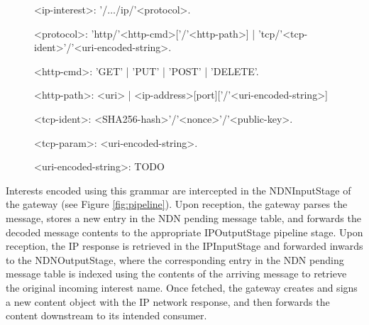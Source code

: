 \begin{figure}
\begin{mdframed}
\begingrammar
\noindent
<ip-interest>:	'/$\dots$/ip/'<protocol>.

<protocol>:	'http/'<http-cmd>[{'/'<http-path>}] | 'tcp/'<tcp-ident>'/'<uri-encoded-string>. 

<http-cmd>: 'GET' | 'PUT' | 'POST' | 'DELETE'.


<http-path>: <uri> | <ip-address>[port]['/'<uri-encoded-string>]

<tcp-ident>: <SHA256-hash>'/'<nonce>'/'<public-key>. %

<tcp-param>: <uri-encoded-string>.

<uri-encoded-string>: TODO



		
\endgrammar
\end{mdframed}
\end{figure}

Interests encoded using this grammar are intercepted in the NDNInputStage of the gateway (see Figure \ref{fig:pipeline}). Upon reception, the gateway parses the message, stores a new entry in the NDN pending message table, and forwards the decoded message contents to the appropriate IPOutputStage pipeline stage. Upon reception, the IP response is retrieved in the IPInputStage and forwarded inwards to the NDNOutputStage, where the corresponding entry in the NDN pending message table is indexed using the contents of the arriving message to retrieve the original incoming interest name. Once fetched, the gateway creates and signs a new content object with the IP network response, and then forwards the content downstream to its intended consumer. 

